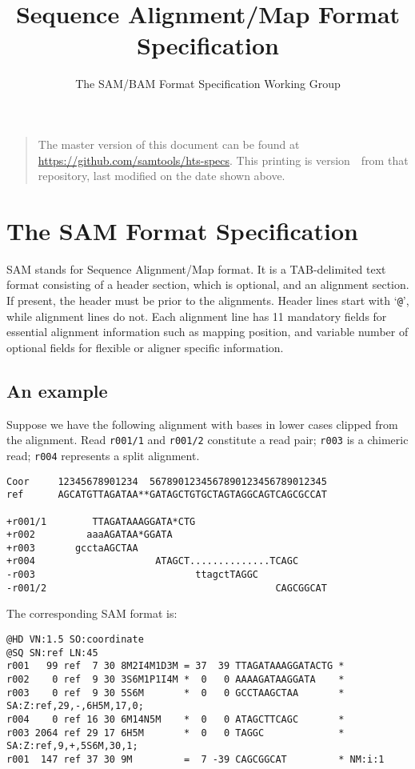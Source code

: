 \documentclass[10pt]{article}
\begin{document}

\title{Sequence Alignment/Map Format Specification}
\author{The SAM/BAM Format Specification Working Group}
\date{\headdate}
\maketitle
\begin{quote}\small
The master version of this document can be found at
\url{https://github.com/samtools/hts-specs}.
This printing is version~\commitdesc\ from that repository,
last modified on the date shown above.
\end{quote}
\vspace*{1em}


\section{The SAM Format Specification}
SAM stands for Sequence Alignment/Map format. It is a TAB-delimited text
format consisting of a header section, which is optional, and an
alignment section. If present, the header must be prior to the
alignments. Header lines start with `{\tt @}', while alignment lines do
not. Each alignment line has 11 mandatory fields for essential alignment
information such as mapping position, and variable number of optional
fields for flexible or aligner specific information.

\subsection{An example}\label{sec:example}
Suppose we have the following alignment with bases in lower cases
clipped from the alignment. Read {\tt r001/1} and {\tt r001/2}
constitute a read pair; {\tt r003} is a chimeric read; {\tt r004}
represents a split alignment.

\begin{framed}\small
\begin{verbatim}
Coor     12345678901234  5678901234567890123456789012345
ref      AGCATGTTAGATAA**GATAGCTGTGCTAGTAGGCAGTCAGCGCCAT

+r001/1        TTAGATAAAGGATA*CTG
+r002         aaaAGATAA*GGATA
+r003       gcctaAGCTAA
+r004                     ATAGCT..............TCAGC
-r003                            ttagctTAGGC
-r001/2                                        CAGCGGCAT
\end{verbatim}
\end{framed}
The corresponding SAM format is:
\begin{framed}\small
\begin{verbatim}
@HD VN:1.5 SO:coordinate
@SQ SN:ref LN:45
r001   99 ref  7 30 8M2I4M1D3M = 37  39 TTAGATAAAGGATACTG *
r002    0 ref  9 30 3S6M1P1I4M *  0   0 AAAAGATAAGGATA    *
r003    0 ref  9 30 5S6M       *  0   0 GCCTAAGCTAA       * SA:Z:ref,29,-,6H5M,17,0;
r004    0 ref 16 30 6M14N5M    *  0   0 ATAGCTTCAGC       *
r003 2064 ref 29 17 6H5M       *  0   0 TAGGC             * SA:Z:ref,9,+,5S6M,30,1;
r001  147 ref 37 30 9M         =  7 -39 CAGCGGCAT         * NM:i:1
\end{verbatim}
\end{framed}
\end{document}
